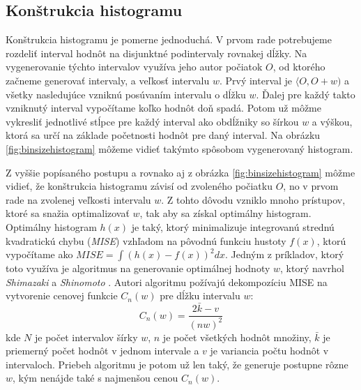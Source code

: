 \subsection{Konštrukcia histogramu}
Konštrukcia histogramu je pomerne jednoduchá. V prvom rade potrebujeme rozdeliť interval hodnôt na disjunktné podintervaly rovnakej dĺžky. Na vygenerovanie týchto intervalov využíva jeho autor počiatok $ O $, od ktorého začneme generovať intervaly, a veľkosť intervalu $ w $. Prvý interval je $ \langle O, O + w) $ a všetky nasledujúce vzniknú posúvaním intervalu o dĺžku $ w $. Ďalej pre každý takto vzniknutý interval vypočítame koľko hodnôt doň spadá.  Potom už môžme vykresliť jednotlivé stĺpce pre každý interval ako obdĺžniky so šírkou $ w $ a výškou, ktorá sa určí na základe početnosti hodnôt pre daný interval. Na obrázku \ref{fig:binsizehistogram} môžeme vidieť takýmto spôsobom vygenerovaný histogram.

Z vyššie popísaného postupu a rovnako aj z obrázka \ref{fig:binsizehistogram} môžme vidieť, že konštrukcia histogramu závisí od zvoleného počiatku $ O $, no v prvom rade na zvolenej veľkosti intervalu $ w $. Z tohto dôvodu vzniklo mnoho prístupov, ktoré sa snažia optimalizovať $ w $, tak aby sa získal optimálny histogram. Optimálny histogram $ h(x) $ je taký, ktorý minimalizuje integrovanú strednú kvadratickú chybu (\textit{MISE}) vzhľadom na pôvodnú funkciu hustoty $ f(x) $, ktorú vypočítame ako $ MISE = \int (h(x) - f(x))^2 dx $. Jedným z príkladov, ktorý toto využíva je algoritmus na generovanie optimálnej hodnoty $ w $, ktorý navrhol \textit{Shimazaki} a \textit{Shinomoto} \cite{OptBinSize}. Autori algoritmu požívajú dekompozíciu MISE na vytvorenie cenovej funkcie $ C_{n}(w) $ pre dĺžku intervalu $ w $:
\[
	C_{n}(w) = \frac{2\bar{k} - v}{(nw)^2}
\]
kde $ N $ je počet intervalov šírky $ w $, $ n $ je počet všetkých hodnôt množiny, $ \bar{k}$ je priemerný počet hodnôt v jednom intervale a $ v $ je variancia počtu hodnôt v intervaloch. Priebeh algoritmu je potom už len taký, že generuje postupne rôzne $ w $, kým nenájde také s najmenšou cenou $ C_{n}(w) $.

